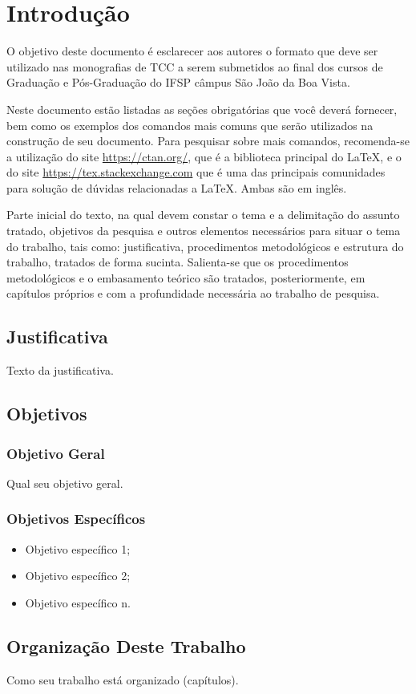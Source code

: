 \chapter{Introdução}
\label{cap:01}

O objetivo deste documento é esclarecer aos autores o formato que deve ser utilizado nas monografias de TCC a serem submetidos ao final dos cursos de Graduação e Pós-Graduação do IFSP câmpus São João da Boa Vista.

Neste documento estão listadas as seções obrigatórias que você deverá fornecer, bem como os exemplos dos comandos mais comuns que serão utilizados na construção de seu documento. Para pesquisar sobre mais comandos, recomenda-se a utilização do site \url{https://ctan.org/}, que é a biblioteca principal do \LaTeX, e o do site \url{https://tex.stackexchange.com} que é uma das principais comunidades para solução de dúvidas relacionadas a \LaTeX. Ambas são em inglês.

Parte inicial do texto, na qual devem constar o tema e a delimitação do assunto tratado, objetivos da pesquisa e outros elementos necessários para situar o tema do trabalho, tais como: justificativa, procedimentos metodológicos e estrutura do trabalho, tratados de forma sucinta. Salienta-se que os procedimentos metodológicos e o embasamento teórico são tratados, posteriormente, em capítulos próprios e com a profundidade necessária ao trabalho de pesquisa.

\section{Justificativa}

Texto da justificativa.

\section{Objetivos}

\subsection{Objetivo Geral}

Qual seu objetivo geral.

\subsection{Objetivos Específicos}
\begin{itemize}
	\item Objetivo específico 1;
	\item Objetivo específico 2;
	\item Objetivo específico n.
\end{itemize}



\section{Organização Deste Trabalho}

Como seu trabalho está organizado (capítulos).